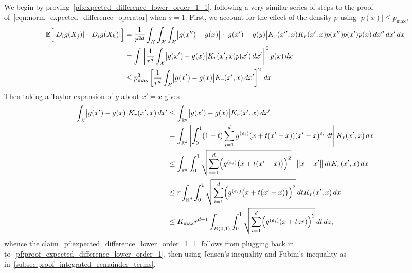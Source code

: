 \documentclass{article}
\newcommand{\Reals}{\mathbb{R}}
\newcommand{\abs}[1]{\left \lvert #1 \right \rvert}
\newcommand{\1}{\mathbf{1}}
\newcommand{\Rd}{\Reals^d}
\newcommand{\Xset}{\mathcal{X}}
\newcommand{\Ebb}{\mathbb{E}}
\theoremstyle{alden}
\theoremstyle{aldenthm}
\theoremstyle{definition}
\theoremstyle{remark}
\begin{document}
We begin by proving~\eqref{pf:expected_difference_lower_order_1_1}, following a very similar series of steps to the proof of~\eqref{eqn:norm_expected_difference_operator} when $s = 1$. First, we account for the effect of the density $p$ using $|p(x)| \leq p_{\max}$, 
\begin{align}
\Ebb\Bigl[\abs{D_{i}g(X_j)} \cdot \abs{D_ig(X_h)} \Bigr] & = \frac{1}{r^{2d}}\int_{\Xset} \int_{\Xset} \int_{\Xset} \bigl|g(x'') - g(x)\bigr| \cdot \bigl|g(x') - g(y)\bigr| K_r(x'',x) K_r(x',x) p(x'') p(x') p(x) \,dx'' \,dx' \,dx \nonumber \\
& = \int \left[\frac{1}{r^d}\int_{\Xset} \bigl|g(x') - g(x)\bigr| K_r(x',x) p(x') \,dx'\right]^2 p(x) \,dx \nonumber \\
& \leq p_{\max}^3 \left[\frac{1}{r^d}\int_{\Xset} \bigl|g(x') - g(x)\bigr| K_r(x',x) \,dx'\right]^2 \,dx \label{pf:proof_expected_difference_lower_order_1}
\end{align}
Then taking a Taylor expansion of $g$ about $x' = x$ gives 
\begin{align*}
\int_{\Xset} \bigl|g(x') - g(x)\bigr| K_r(x',x) \,dx' & \leq \int_{\Rd} \bigl|g(x') - g(x)\bigr| K_r(x',x) \,dx' \\
& = \int_{\Rd} \abs{\int_{0}^{1} (1 - t) \sum_{i = 1}^{d} g^{(e_i)}(x + t(x' - x)) (x' - x)^{e_i} \,dt} K_r(x',x) \,dx \\
& \leq \int_{\Rd} \int_{0}^{1} \sqrt{\sum_{i = 1}^{d}\Bigl(g^{(e_i)}\bigl(x + t(x' - x)\bigr)\Bigr)^2} \cdot \bigl\|x - x'\bigr\| \,dt K_r(x',x) \,dx \\
& \leq r \int_{\Rd} \int_{0}^{1} \sqrt{\sum_{i = 1}^{d}\Bigl(g^{(e_i)}\bigl(x + t(x' - x)\bigr)\Bigr)^2} \,dt K_r(x',x) \,dx \\
& \leq K_{\max} r^{d + 1} \int_{B(0,1)} \int_{0}^{1} \sqrt{\sum_{i = 1}^{d}\Bigl(g^{(e_i)}(x + tzr)\Bigr)^2} \,dt \,dz,
\end{align*}
whence the claim~\eqref{pf:expected_difference_lower_order_1_1} follows from plugging back in to~\eqref{pf:proof_expected_difference_lower_order_1}, then using Jensen's inequality and Fubini's inequality as in~\ref{subsec:proof_integrated_remainder_terms}.
\end{document}
